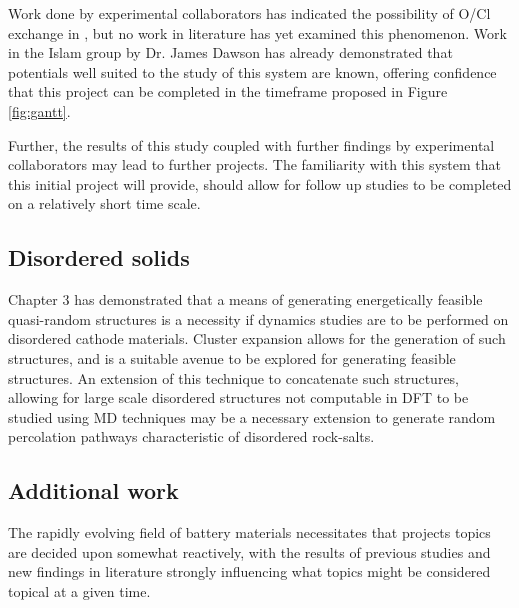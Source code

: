 Work done by experimental collaborators has indicated the possibility of O/Cl exchange in , but no work in literature has yet examined this phenomenon.
Work in the Islam group by Dr. James Dawson has already demonstrated that potentials well suited to the study of this system are known, offering confidence that this project can be completed in the timeframe proposed in Figure \ref{fig:gantt}.

Further, the results of this study coupled with further findings by experimental collaborators may lead to further projects.
The familiarity with this system that this initial project will provide, should allow for follow up studies to be completed on a relatively short time scale.

\subsection{Disordered solids}
Chapter 3 has demonstrated that a means of generating energetically feasible quasi-random structures is a necessity if dynamics studies are to be performed on disordered cathode materials.
Cluster expansion\cite{Chang2019} allows for the generation of such structures, and is a suitable avenue to be explored for generating feasible structures.
An extension of this technique to concatenate such structures, allowing for large scale disordered structures not computable in DFT to be studied using MD techniques may be a necessary extension to generate random percolation pathways characteristic of disordered rock-salts.

\subsection{Additional work}
The rapidly evolving field of battery materials necessitates that projects topics are decided upon somewhat reactively, with the results of previous studies and new findings in literature strongly influencing what topics might be considered topical at a given time.


